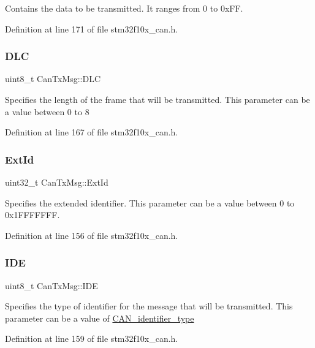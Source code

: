 Contains the data to be transmitted. It ranges from 0 to 0x\+FF. 

Definition at line 171 of file stm32f10x\+\_\+can.\+h.

\mbox{\label{struct_can_tx_msg_ab49d0fa602aad2fd9cd007adafc11fc2}} 
\subsubsection{\texorpdfstring{D\+LC}{DLC}}
{\footnotesize\ttfamily uint8\+\_\+t Can\+Tx\+Msg\+::\+D\+LC}

Specifies the length of the frame that will be transmitted. This parameter can be a value between 0 to 8 

Definition at line 167 of file stm32f10x\+\_\+can.\+h.

\mbox{\label{struct_can_tx_msg_a33050a95a4cc463b589ff16bdd416f22}} 
\subsubsection{\texorpdfstring{Ext\+Id}{ExtId}}
{\footnotesize\ttfamily uint32\+\_\+t Can\+Tx\+Msg\+::\+Ext\+Id}

Specifies the extended identifier. This parameter can be a value between 0 to 0x1\+F\+F\+F\+F\+F\+FF. 

Definition at line 156 of file stm32f10x\+\_\+can.\+h.

\mbox{\label{struct_can_tx_msg_aa4c8568a0e3250a17bd7e116b3e09670}} 
\subsubsection{\texorpdfstring{I\+DE}{IDE}}
{\footnotesize\ttfamily uint8\+\_\+t Can\+Tx\+Msg\+::\+I\+DE}

Specifies the type of identifier for the message that will be transmitted. This parameter can be a value of \hyperlink{group___c_a_n__identifier__type}{C\+A\+N\+\_\+identifier\+\_\+type} 

Definition at line 159 of file stm32f10x\+\_\+can.\+h.

